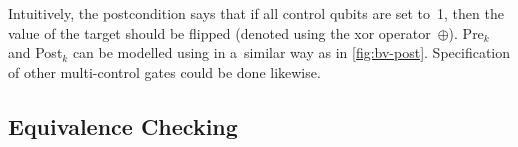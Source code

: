 %
Intuitively, the postcondition says that if all control qubits are set to~1,
then the value of the target should be flipped (denoted using the xor
operator~$\oplus$).
\mbox{Pre$_k$} and \mbox{Post$_k$} can be modelled using \lstas in
a~similar way as in \cref{fig:bv-post}.
Specification of other multi-control gates could be done likewise.
%

\newcommand{\figEqVec}[0]{
\begin{wrapfigure}[9]{r}{0.65\textwidth}
    \centering
    \vspace{-4mm}
    \scalebox{0.7}{
      
    }
    \vspace{-7mm}
    \caption{LSTA for the pre- and post-condition for equivalence
    checking}
    \label{fig:EqBasis}
\end{wrapfigure}}



\vspace{-0.0mm}
\subsection{Equivalence Checking}\label{sec:equivalence_checking}
\vspace{-0.0mm}

